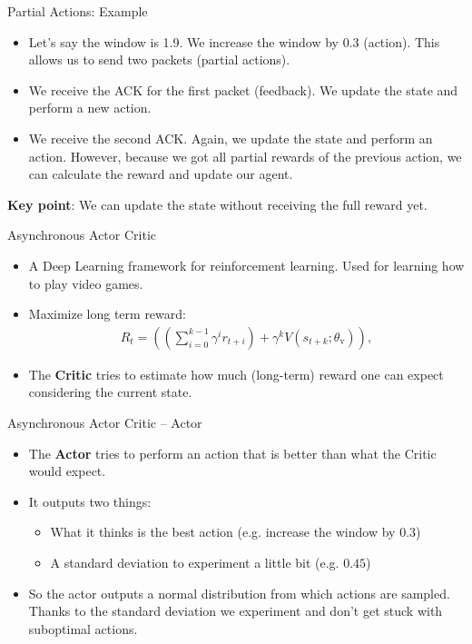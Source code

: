 \documentclass[11pt]{beamer}
\begin{document}
\begin{frame}{Partial Actions: Example}
\begin{itemize}
\item Let's say the window is 1.9. We increase the window by $0.3$ (action). This allows us to send two packets (partial actions).  
\item We receive the ACK for the first packet (feedback). We update the state and perform a new action.
\item We receive the second ACK. Again, we update the state and perform an action. However, because we got all partial rewards of the previous action, we can calculate the reward and update our agent.
\end{itemize}
\textbf{Key point}: We can update the state without receiving the full reward yet.
\end{frame}

\begin{frame}{Asynchronous Actor Critic}
\begin{itemize}
\item A Deep Learning framework for reinforcement learning. Used for learning how to play video games.
\item Maximize long term reward: \begin{align*}
R_t = \left(\left(\sum_{i=0}^{k-1} \gamma^ir_{t+i}\right) + \gamma^k V(s_{t+k}; \theta_\text{v})\right),
\end{align*}
\item The \textbf{Critic} tries to estimate how much (long-term) reward one can expect considering the current state.
\end{itemize}
\end{frame}

\begin{frame}{Asynchronous Actor Critic -- Actor}
\begin{itemize}
\item The \textbf{Actor} tries to perform an action that is better than what the Critic would expect.
\item It outputs two things:
\begin{itemize}
\item What it thinks is the best action (e.g. increase the window by $0.3$)
\item A standard deviation to experiment a little bit (e.g. $0.45$)
\end{itemize}
\item So the actor outputs a normal distribution from which actions are sampled. Thanks to the standard deviation we experiment and don't get stuck with suboptimal actions. 
\end{itemize}
\end{frame}
\end{document}
